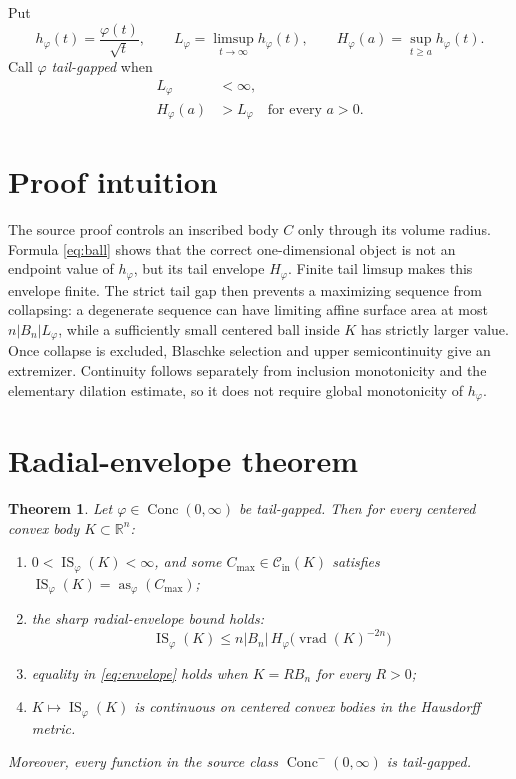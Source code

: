 \documentclass[11pt]{article}
\newtheorem{theorem}{Theorem}
\newcommand{\R}{\mathbb{R}}
\newcommand{\IS}{\operatorname{IS}}
\newcommand{\as}{\operatorname{as}}
\newcommand{\vrad}{\operatorname{vrad}}
\newcommand{\Cin}{\mathcal{C}_{\mathrm{in}}}
\begin{document}
Put
\[
 h_\varphi(t)=\frac{\varphi(t)}{\sqrt t},\qquad
 L_\varphi=\limsup_{t\to\infty}h_\varphi(t),\qquad
 H_\varphi(a)=\sup_{t\ge a}h_\varphi(t).
\]
Call $\varphi$ \emph{tail-gapped} when
\begin{equation}\label{eq:tailgap}
 \begin{aligned}
 L_\varphi&<\infty,\\
 H_\varphi(a)&>L_\varphi\quad\text{for every }a>0.
 \end{aligned}
\end{equation}

\section{Proof intuition}

The source proof controls an inscribed body $C$ only through its volume
radius.  Formula \eqref{eq:ball} shows that the correct one-dimensional object
is not an endpoint value of $h_\varphi$, but its tail envelope $H_\varphi$.
Finite tail limsup makes this envelope finite.  The strict tail gap then
prevents a maximizing sequence from collapsing: a degenerate sequence can
have limiting affine surface area at most $n|B_n|L_\varphi$, while a sufficiently
small centered ball inside $K$ has strictly larger value.  Once collapse is
excluded, Blaschke selection and upper semicontinuity give an extremizer.
Continuity follows separately from inclusion monotonicity and the elementary
dilation estimate, so it does not require global monotonicity of
$h_\varphi$.

\section{Radial-envelope theorem}

\begin{theorem}\label{thm:main}
Let $\varphi\in\operatorname{Conc}(0,\infty)$ be tail-gapped.  Then for every
centered convex body $K\subset\R^n$:
\begin{enumerate}
 \item $0<\IS_\varphi(K)<\infty$, and some
 $C_{\max}\in\Cin(K)$ satisfies
 $\IS_\varphi(K)=\as_\varphi(C_{\max})$;
 \item the sharp radial-envelope bound holds:
 \begin{equation}\label{eq:envelope}
  \IS_\varphi(K)
  \le n|B_n|\,H_\varphi\bigl(\vrad(K)^{-2n}\bigr)
 \end{equation}
 \item equality in \eqref{eq:envelope} holds when $K=RB_n$ for every $R>0$;
 \item $K\mapsto\IS_\varphi(K)$ is continuous on centered convex bodies in
 the Hausdorff metric.
\end{enumerate}
Moreover, every function in the source class
$\operatorname{Conc}^{-}(0,\infty)$ is tail-gapped.
\end{theorem}
\end{document}
